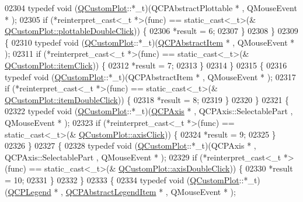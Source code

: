 \begin{DoxyCode}
02304             \textcolor{keyword}{typedef} void (\hyperlink{a00030_d8/d00/a00186}{QCustomPlot}::*\_t)(QCPAbstractPlottable * , QMouseEvent * );
02305             \textcolor{keywordflow}{if} (*reinterpret\_cast<\_t *>(func) == \textcolor{keyword}{static\_cast<}\_t\textcolor{keyword}{>}(&
      \hyperlink{a00116_af2e6f1cea923dae437681d01ce7d0c31}{QCustomPlot::plottableDoubleClick})) \{
02306                 *result = 6;
02307             \}
02308         \}
02309         \{
02310             \textcolor{keyword}{typedef} void (\hyperlink{a00030_d8/d00/a00186}{QCustomPlot}::*\_t)(\hyperlink{a00022}{QCPAbstractItem} * , QMouseEvent * );
02311             \textcolor{keywordflow}{if} (*reinterpret\_cast<\_t *>(func) == \textcolor{keyword}{static\_cast<}\_t\textcolor{keyword}{>}(&
      \hyperlink{a00116_ae16b51f52d2b7aebbc7e3e74e6ff2e4b}{QCustomPlot::itemClick})) \{
02312                 *result = 7;
02313             \}
02314         \}
02315         \{
02316             \textcolor{keyword}{typedef} void (\hyperlink{a00030_d8/d00/a00186}{QCustomPlot}::*\_t)(QCPAbstractItem * , QMouseEvent * );
02317             \textcolor{keywordflow}{if} (*reinterpret\_cast<\_t *>(func) == \textcolor{keyword}{static\_cast<}\_t\textcolor{keyword}{>}(&
      \hyperlink{a00116_ac83aa9f5a3e9bb3efc9cdc763dcd42a6}{QCustomPlot::itemDoubleClick})) \{
02318                 *result = 8;
02319             \}
02320         \}
02321         \{
02322             \textcolor{keyword}{typedef} void (\hyperlink{a00030_d8/d00/a00186}{QCustomPlot}::*\_t)(\hyperlink{a00025}{QCPAxis} * , QCPAxis::SelectablePart , 
      QMouseEvent * );
02323             \textcolor{keywordflow}{if} (*reinterpret\_cast<\_t *>(func) == \textcolor{keyword}{static\_cast<}\_t\textcolor{keyword}{>}(&
      \hyperlink{a00116_abf635f8b56ab5c16d5de9f358543e82b}{QCustomPlot::axisClick})) \{
02324                 *result = 9;
02325             \}
02326         \}
02327         \{
02328             \textcolor{keyword}{typedef} void (\hyperlink{a00030_d8/d00/a00186}{QCustomPlot}::*\_t)(QCPAxis * , QCPAxis::SelectablePart , QMouseEvent *
       );
02329             \textcolor{keywordflow}{if} (*reinterpret\_cast<\_t *>(func) == \textcolor{keyword}{static\_cast<}\_t\textcolor{keyword}{>}(&
      \hyperlink{a00116_a6df35357460181a72da3e93d600f5256}{QCustomPlot::axisDoubleClick})) \{
02330                 *result = 10;
02331             \}
02332         \}
02333         \{
02334             \textcolor{keyword}{typedef} void (\hyperlink{a00030_d8/d00/a00186}{QCustomPlot}::*\_t)(\hyperlink{a00045}{QCPLegend} * , 
      \hyperlink{a00023}{QCPAbstractLegendItem} * , QMouseEvent * );

\end{DoxyCode}
